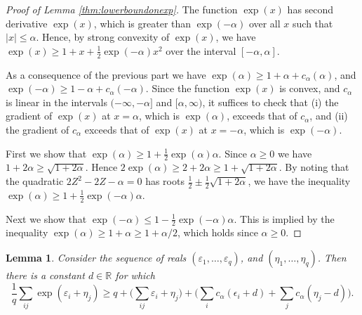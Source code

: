 \documentclass[11pt,letterpaper]{article}
\newtheorem{lemma}[theorem]{Lemma}
\begin{document}
\begin{proof}[Proof of Lemma \ref{thm:lowerboundonexp}]
	The function $\exp(x)$ has second derivative $\exp(x)$, which is greater than $\exp(-\alpha)$ over all $x$ such that $|x| \leq \alpha$.  Hence, by strong convexity of $\exp(x)$, we have $\exp(x) \geq 1 + x + \frac{1}{2} \exp(-\alpha) x^2$ over the interval $[-\alpha,\alpha]$.
	
	As a consequence of the previous part we have $\exp(\alpha) \geq 1 + \alpha + c_{\alpha} (\alpha)$, and $\exp(-\alpha) \geq 1 - \alpha + c_{\alpha} (-\alpha)$.  Since the function $\exp(x)$ is convex, and $c_{\alpha}$ is linear in the intervals $(-\infty,-\alpha]$ and $[\alpha,\infty)$, it suffices to check that (i) the gradient of $\exp(x)$ at $x=\alpha$, which is $\exp(\alpha)$, exceeds that of $c_{\alpha}$, and (ii) the gradient of $c_{\alpha}$ exceeds that of $\exp(x)$ at $x = -\alpha$, which is $\exp(-\alpha)$.
	
	First we show that $\exp(\alpha) \geq 1 + \frac{1}{2} \exp(\alpha) \alpha$.  Since $\alpha \geq 0$ we have $1+2\alpha \geq \sqrt{1+2\alpha}$.  Hence $2 \exp(\alpha) \geq 2 + 2 \alpha \geq 1 + \sqrt{1 + 2\alpha}$.  By noting that the quadratic $2Z^2- 2Z - \alpha=0$ has roots $\frac{1}{2} \pm \frac{1}{2} \sqrt{1 + 2\alpha}$, we have the inequality $\exp(\alpha) \geq 1 + \frac{1}{2} \exp(-\alpha) \alpha$.
	
	Next we show that $\exp(-\alpha) \leq 1 - \frac{1}{2} \exp(-\alpha) \alpha$.  This is implied by the inequality $\exp(\alpha) \geq 1+\alpha \geq 1 + \alpha/2$, which holds since $\alpha \geq 0$.
\end{proof}

\begin{lemma}\label{thm:lbsumexps}
	Consider the sequence of reals $(\varepsilon_1,\ldots,\varepsilon_q)$, and $(\eta_1,\ldots, \eta_q)$. Then there is a constant $d \in \mathbb{R}$ for which
	\begin{equation*}
		\frac{1}{q}\sum_{ij} \exp(\varepsilon_i + \eta_j ) \geq q + \biggl( \sum_{ij} \varepsilon_i + \eta_j \biggr) + \biggl( \sum_{i} c_{\alpha} (\epsilon_i + d) + \sum_j c_{\alpha} (\eta_j - d) \biggr).
	\end{equation*}
\end{lemma}
\end{document}
